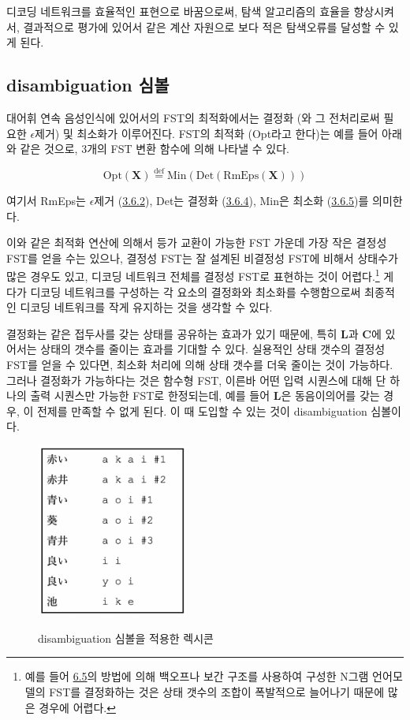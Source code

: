 \documentclass[../main.tex]{subfiles}
\begin{document}
디코딩 네트워크를 효율적인 표현으로 바꿈으로써, 탐색 알고리즘의 효율을 향상시켜서, 결과적으로 평가에 있어서 같은 계산 자원으로 보다 적은 탐색오류를 달성할 수 있게 된다. 

\subsection{disambiguation 심볼}
대어휘 연속 음성인식에 있어서의 FST의 최적화에서는 결정화 (와 그 전처리로써 필요한 $\epsilon$제거) 및 최소화가 이루어진다. 
FST의 최적화 (Opt라고 한다)는 예를 들어 아래와 같은 것으로, 3개의 FST 변환 함수에 의해 나타낼 수 있다. 

\begin{equation}\label{eq:7_3}
    \text{Opt}(\bm{X}) \stackrel{\text{def}}{=} \text{Min}(\text{Det}(\text{RmEps}(\bm{X})))
\end{equation}

여기서 RmEps는 $\epsilon$제거 (\hyperref[subsec:epsilon-remove]{3.6.2}), Det는 결정화 (\hyperref[subsec:determinization]{3.6.4}), Min은 최소화 (\hyperref[subsec:minimization]{3.6.5})를 의미한다. 

이와 같은 최적화 연산에 의해서 등가 교환이 가능한 FST 가운데 가장 작은 결정성 FST를 얻을 수는 있으나, 결정성 FST는 잘 설계된 비결정성 FST에 비해서 상태수가 많은 경우도 있고, 디코딩 네트워크 전체를 결정성 FST로 표현하는 것이 어렵다.\footnote{예를 들어 \hyperref[sec:N-gram-FST]{6.5}의 방법에 의해 백오프나 보간 구조를 사용하여 구성한 N그램 언어모델의 FST를 결정화하는 것은 상태 갯수의 조합이 폭발적으로 늘어나기 때문에 많은 경우에 어렵다.}
게다가 디코딩 네트워크를 구성하는 각 요소의 결정화와 최소화를 수행함으로써 최종적인 디코딩 네트워크를 작게 유지하는 것을 생각할 수 있다. 

결정화는 같은 접두사를 갖는 상태를 공유하는 효과가 있기 때문에, 특히 $\bm{L}$과 $\bm{C}$에 있어서는 상태의 갯수를 줄이는 효과를 기대할 수 있다. 
실용적인 상태 갯수의 결정성 FST를 얻을 수 있다면, 최소화 처리에 의해 상태 갯수를 더욱 줄이는 것이 가능하다. 
그러나 결정화가 가능하다는 것은 함수형 FST, 이른바 어떤 입력 시퀀스에 대해 단 하나의 출력 시퀀스만 가능한 FST로 한정되는데, 예를 들어 $\bm{L}$은 동음이의어를 갖는 경우, 이 전제를 만족할 수 없게 된다. 
이 때 도입할 수 있는 것이 disambiguation 심볼이다. 

\begin{figure}[h]
    \centering
    \includegraphics[width=5cm]{../figures/fig7_2_orig.png}\label{fig:7_2}
    \caption{disambiguation 심볼을 적용한 렉시콘}
\end{figure}
\end{document}
